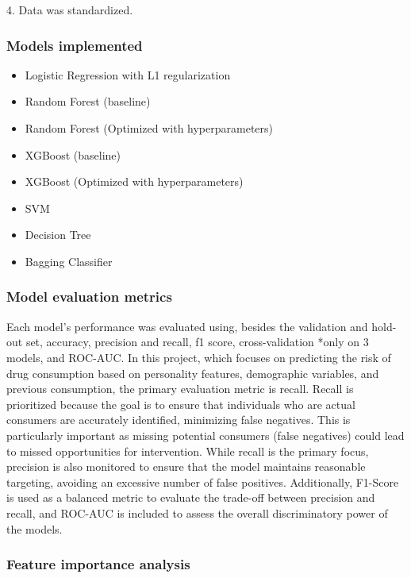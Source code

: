 \documentclass{article}
\begin{document}
4. Data was standardized.

\subsubsection*{Models implemented}

\begin{itemize}
    \item Logistic Regression with L1 regularization
    \item Random Forest (baseline)
    \item Random Forest (Optimized with hyperparameters)
    \item XGBoost (baseline)
    \item XGBoost (Optimized with hyperparameters)
    \item SVM
    \item Decision Tree
    \item Bagging Classifier
\end{itemize}


\subsubsection*{Model evaluation metrics}

Each model’s performance was evaluated using, besides the validation and hold-out set, accuracy, precision and recall, f1 score, cross-validation *only on 3 models, and ROC-AUC.
In this project, which focuses on predicting the risk of drug consumption based on personality features, demographic variables, and previous consumption, the primary evaluation metric is recall. Recall is prioritized because the goal is to ensure that individuals who are actual consumers are accurately identified, minimizing false negatives. This is particularly important as missing potential consumers (false negatives) could lead to missed opportunities for intervention. While recall is the primary focus, precision is also monitored to ensure that the model maintains reasonable targeting, avoiding an excessive number of false positives. Additionally, F1-Score is used as a balanced metric to evaluate the trade-off between precision and recall, and ROC-AUC is included to assess the overall discriminatory power of the models.

\subsubsection*{Feature importance analysis}
\end{document}
